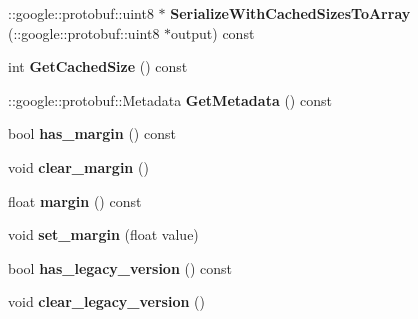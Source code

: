\begin{DoxyCompactItemize}
\item 
\mbox{\label{classcaffe_1_1_contrastive_loss_parameter_a2c7c15ad4e25b21444f7688e04c84a30}} 
\+::google\+::protobuf\+::uint8 $\ast$ {\bfseries Serialize\+With\+Cached\+Sizes\+To\+Array} (\+::google\+::protobuf\+::uint8 $\ast$output) const
\item 
\mbox{\label{classcaffe_1_1_contrastive_loss_parameter_abbd2c3a13ffaf793e35d880e1697c355}} 
int {\bfseries Get\+Cached\+Size} () const
\item 
\mbox{\label{classcaffe_1_1_contrastive_loss_parameter_a9722843c1a9ef78440f5509432d2680a}} 
\+::google\+::protobuf\+::\+Metadata {\bfseries Get\+Metadata} () const
\item 
\mbox{\label{classcaffe_1_1_contrastive_loss_parameter_a7e33a224e727bc6ae962c2a3996806be}} 
bool {\bfseries has\+\_\+margin} () const
\item 
\mbox{\label{classcaffe_1_1_contrastive_loss_parameter_a47087eabc253b2544ecd47f1a100bf35}} 
void {\bfseries clear\+\_\+margin} ()
\item 
\mbox{\label{classcaffe_1_1_contrastive_loss_parameter_a7f5c482f09ea32ab1cbe2cded3dead51}} 
float {\bfseries margin} () const
\item 
\mbox{\label{classcaffe_1_1_contrastive_loss_parameter_adff3d85a13dce0750c14a26834397a35}} 
void {\bfseries set\+\_\+margin} (float value)
\item 
\mbox{\label{classcaffe_1_1_contrastive_loss_parameter_aa58e7a94256972da94b8dac37b9e392d}} 
bool {\bfseries has\+\_\+legacy\+\_\+version} () const
\item 
\mbox{\label{classcaffe_1_1_contrastive_loss_parameter_ad2eabfab55ae218cb97541f88c04314f}} 
void {\bfseries clear\+\_\+legacy\+\_\+version} ()
\item 

\end{DoxyCompactItemize}

